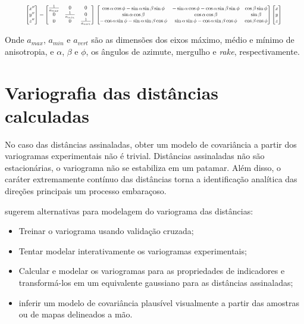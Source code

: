 \begin{equation}
\resizebox{.9 \textwidth}{!}{%
$
\begin{bmatrix} x'' \\ y'' \\ z'' \end{bmatrix} = \begin{bmatrix} \frac{1}{a_{max}} & 0 & 0 \\ 0 & \frac{1}{a_{min}} & 0 \\ 0 & 0 & \frac{1}{a_{vert}} \end{bmatrix} \\ \begin{bmatrix}\cos\alpha\cos\phi-\sin\alpha\sin\beta\sin\phi & -\sin\alpha\cos\phi-\cos\alpha\sin\beta\sin\phi & \cos\beta\sin\phi \\ \sin\alpha\cos\beta & \cos\alpha\cos\beta & \sin\beta \\ -\cos\alpha\sin\phi-\sin\alpha\sin\beta\cos\phi & \sin\alpha\sin\phi-\cos\alpha\sin\beta\cos\phi & \cos\beta\cos\phi \end{bmatrix} \begin{bmatrix} x \\ y \\ z \end{bmatrix}
$
}
\label{eq_rot_matrix}
\end{equation}

Onde $a_{max}$, $a_{min}$ e $a_{vert}$ são as dimensões dos eixos máximo, médio e mínimo de anisotropia, e $\alpha$, $\beta$ e $\phi$, os ângulos de azimute, mergulho e \textit{rake}, respectivamente.

\section{Variografia das distâncias calculadas}

No caso das distâncias assinaladas, obter um modelo de covariância a partir dos variogramas experimentais não é trivial. Distâncias assinaladas não são estacionárias, o variograma não se estabiliza em um patamar. Além disso, o caráter extremamente contínuo das distâncias torna a identificação analítica das direções principais um processo embaraçoso.

 sugerem alternativas para modelagem do variograma das distâncias:

\begin{itemize}
    \item Treinar o variograma usando validação cruzada;
    \item Tentar modelar interativamente os variogramas experimentais;
    \item Calcular e modelar os variogramas para as propriedades de indicadores e transformá-los em um equivalente gaussiano para as distâncias assinaladas;
    \item inferir um modelo de covariância plausível visualmente a partir das amostras ou de mapas delineados a mão.
\end{itemize}

